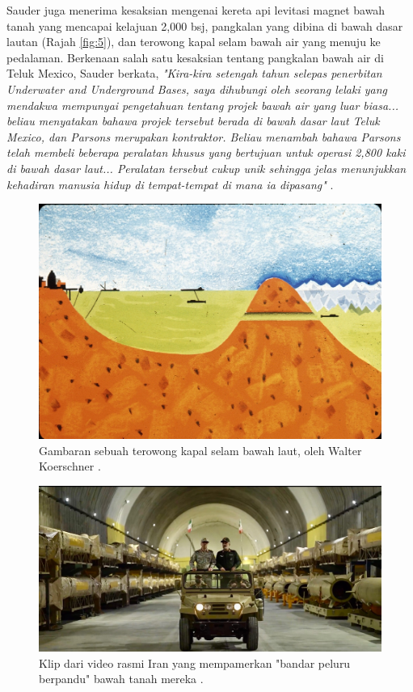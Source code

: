 \documentclass[10pt,twocolumn,letterpaper]{article}
\begin{document}
Sauder juga menerima kesaksian mengenai kereta api levitasi magnet bawah tanah yang mencapai kelajuan 2,000 bsj, pangkalan yang dibina di bawah dasar lautan (Rajah \ref{fig:5}), dan terowong kapal selam bawah air yang menuju ke pedalaman. Berkenaan salah satu kesaksian tentang pangkalan bawah air di Teluk Mexico, Sauder berkata, \textit{"Kira-kira setengah tahun selepas penerbitan Underwater and Underground Bases, saya dihubungi oleh seorang lelaki yang mendakwa mempunyai pengetahuan tentang projek bawah air yang luar biasa... beliau menyatakan bahawa projek tersebut berada di bawah dasar laut Teluk Mexico, dan Parsons merupakan kontraktor. Beliau menambah bahawa Parsons telah membeli beberapa peralatan khusus yang bertujuan untuk operasi 2,800 kaki di bawah dasar laut... Peralatan tersebut cukup unik sehingga jelas menunjukkan kehadiran manusia hidup di tempat-tempat di mana ia dipasang"} \cite{22}.
\begin{figure}[t]
\begin{center}
   \includegraphics[width=1\linewidth]{sub.jpg}
\end{center}
   \caption{Gambaran sebuah terowong kapal selam bawah laut, oleh Walter Koerschner \cite{22,23}.}
\label{fig:6}
\label{fig:onecol}
\end{figure}
\begin{figure}[t]
\begin{center}
   \includegraphics[width=1\linewidth]{iran.jpeg}
\end{center}
   \caption{Klip dari video rasmi Iran yang mempamerkan "bandar peluru berpandu" bawah tanah mereka \cite{39,40}.}
\label{fig:12}
\label{fig:onecol}
\end{figure}
\end{document}
